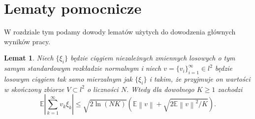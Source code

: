 \documentclass{article}
\newtheorem*{lem}{Lemat}
\newcommand{\norm}[1]{\left\lVert#1\right\rVert}
\begin{document}
\section{Lematy pomocnicze}\label{lematy}
W rozdziale tym podamy dowody lematów użytych do dowodzenia głównych wyników pracy.
\begin{lem}
Niech $\{\xi_i\}$ będzie ciągiem niezależnych zmiennych losowych o tym samym standardowym rozkładzie normalnym i niech $v=\{v_i\}_{i=1}^{\infty}\in l^2$ będzie losowym ciągiem tak samo mierzalnym jak $\{\xi_i\}$ i takim, że przyjmuje on wartości w skończony zbiorze $V\subset l^2$ o liczności $N$. Wtedy dla dowolnego $K\geq 1$ zachodzi
\begin{displaymath}
\mathbb{E}\left|\sum_{k=1}^{\infty}v_k\xi_k\right|\leq \sqrt{2\ln (NK)}\left(\mathbb{E}\norm{v}+\sqrt{2\mathbb{E}\norm{v}^2/K}\right).
\end{displaymath}
\end{lem}
\end{document}
